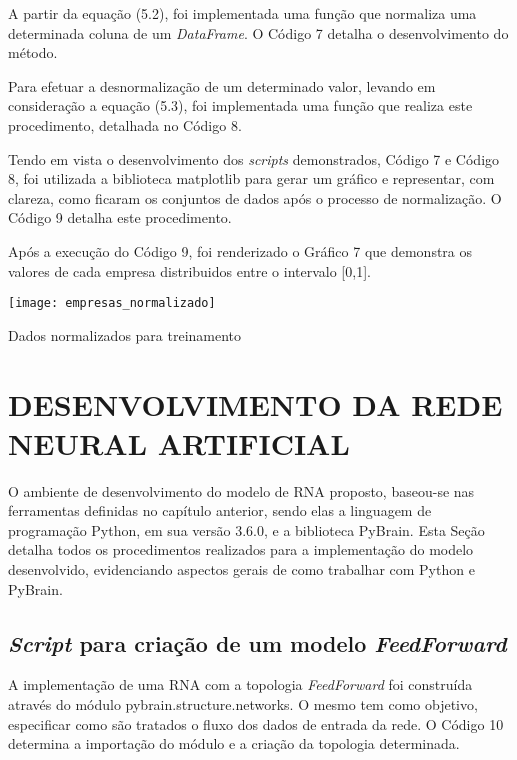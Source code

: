A partir da equação (5.2), foi implementada uma função que normaliza uma determinada coluna de um \textit{DataFrame}. O Código 7 detalha o desenvolvimento do método.


Para efetuar a desnormalização de um determinado valor, levando em consideração a equação (5.3), foi implementada uma função que realiza este procedimento, detalhada no Código 8.
  

Tendo em vista o desenvolvimento dos \textit{scripts} demonstrados, Código 7 e Código 8, foi utilizada a biblioteca matplotlib para gerar um gráfico e representar, com clareza, como ficaram os conjuntos de dados após o processo de normalização. O Código 9 detalha este procedimento.



Após a execução do Código 9, foi renderizado o Gráfico 7 que demonstra os valores de cada empresa distribuidos entre o intervalo [0,1].

\begin{grafico}[h]
	\centering
	\centerline{\texttt{[image: empresas\_normalizado]}}
	\caption{Dados normalizados para treinamento}
	\label{exec-intel-coleta}
\end{grafico}

\section{DESENVOLVIMENTO DA REDE NEURAL ARTIFICIAL}
O ambiente de desenvolvimento do modelo de RNA proposto, baseou-se nas ferramentas definidas no capítulo anterior, sendo elas a linguagem de programação Python, em sua versão 3.6.0, e a biblioteca PyBrain. Esta Seção detalha todos os procedimentos realizados para a implementação do modelo desenvolvido, evidenciando aspectos gerais de como trabalhar com Python e PyBrain.
\subsection{\textit{Script} para criação de um modelo \textit{FeedForward}}
A implementação de uma RNA com a topologia \textit{FeedForward} foi construída através do módulo pybrain.structure.networks. O mesmo tem como objetivo, especificar como são tratados o fluxo dos dados de entrada da rede. O Código 10 determina a importação do módulo e a criação da topologia determinada.

